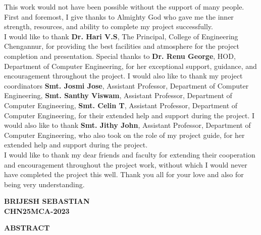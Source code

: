 \documentclass[a4paper,12pt]{report}
\newcommand{\studentname}{BRIJESH SEBASTIAN}
\newcommand{\rollno}{CHN25MCA-2023}
\newcommand{\guidename}{Smt. Jithy John}
\begin{document}
	\noindent This work would not have been possible without the support of many people.
	First and foremost, I give thanks to Almighty God who gave me the inner strength, resources, and ability to complete my project successfully.\\
	I would like to thank \textbf{Dr. Hari V.S}, The Principal, College of Engineering Chengannur, for providing the best facilities and atmosphere for the project completion and presentation. Special thanks to \textbf{Dr. Renu George}, HOD, Department of Computer Engineering, for her exceptional support, guidance, and encouragement throughout the project. I would also like to thank my project coordinators \textbf{Smt. Josmi Jose}, Assistant Professor, Department of Computer Engineering, \textbf{Smt. Santhy Viswam}, Assistant Professor, Department of Computer Engineering, \textbf{Smt. Celin T}, Assistant Professor, Department of Computer Engineering, for their extended help and support during the project. I would also like to thank \textbf{\guidename}, Assistant Professor, Department of Computer Engineering, who also took on the role of my project guide, for her extended help and support during the project.\\
	I would like to thank my dear friends and faculty for extending their cooperation and encouragement throughout the project work, without which I would never have completed the project this well. Thank you all for your love and also for being very understanding.
	
	\begin{flushright}
		\textbf{\studentname\\\rollno}
	\end{flushright}
	\clearpage
	
	\begin{center}
		\Large\textbf{ABSTRACT}
	\end{center}
	\vspace{1cm}
	
\end{document}
